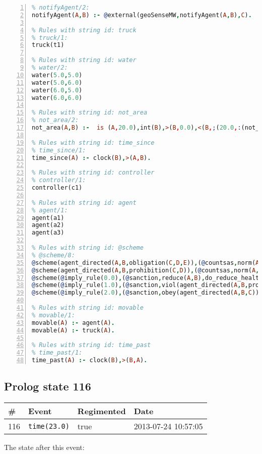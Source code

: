 \documentclass[11pt]{article}\usepackage[utf8]{inputenc}\usepackage{geometry}
\begin{document}
\begin{lstlisting}[language=Prolog, numbers=left]
% Rules with string id: notifyAgent
% notifyAgent/2:
notifyAgent(A,B) :- @external(geoSenseMW,notifyAgent(A,B),C).

% Rules with string id: truck
% truck/1:
truck(t1)

% Rules with string id: water
% water/2:
water(5.0,5.0)
water(5.0,6.0)
water(6.0,5.0)
water(6.0,6.0)

% Rules with string id: not_area
% not_area/2:
not_area(A,B) :-  is (A,20.0),int(B),>(B,0.0),<(B,;(20.0,:(not_area(A,B), is (-(B),20.0)))),int(A),>(A,0.0),<(A,;(20.0,:(area(A,B),-(int(A))))),int(B),>(A,0.0),>(B,0.0),<(A,21.0),<(B,21.0).

% Rules with string id: time_since
% time_since/1:
time_since(A) :- clock(B),>(A,B).

% Rules with string id: controller
% controller/1:
controller(c1)

% Rules with string id: agent
% agent/1:
agent(a1)
agent(a2)
agent(a3)

% Rules with string id: @scheme
% @scheme/8:
@scheme(agent_directed(A,B,obligation(C,D,E)),(@countsas,norm(A,B,F,obligation(C,D,E)),F),false,(listTrue(C)),(time_past(D)),false,[plus(viol(agent_directed(A,B,obligation(C,D,E))))|[]],[plus(obey(agent_directed(A,B,obligation(C,D,E))))|[]])
@scheme(agent_directed(A,B,prohibition(C,D)),(@countsas,norm(A,B,E,prohibition(C,D)),E),(listTrue(C)),false,(false),false,[plus(viol(agent_directed(A,B,prohibition(C,D))))|[]],[plus(obey(agent_directed(A,B,prohibition(C,D))))|[]])
@scheme(@imply_rule(0.0),(@sanction,reduce(A,B),do_reduce_health(A,B),notifyAgent(A,changed(status))),true,false,false,false,[min(reduce(A,B))|[]],[])
@scheme(@imply_rule(1.0),(@sanction,viol(agent_directed(A,B,prohibition(C,D))),do_sanction(D)),true,false,false,false,[min(viol(agent_directed(A,B,prohibition(C,D))))|[]],[])
@scheme(@imply_rule(2.0),(@sanction,obey(agent_directed(A,B,C))),true,false,false,false,[min(obey(agent_directed(A,B,C)))|[]],[])

% Rules with string id: movable
% movable/1:
movable(A) :- agent(A).
movable(A) :- truck(A).

% Rules with string id: time_past
% time_past/1:
time_past(A) :- clock(B),>(B,A).

\end{lstlisting}
\clearpage 
\subsection{Prolog state 116}
\begin{table}[ht]
\centering 
\begin{tabular}{l l l l} 
\textbf{\#} & \textbf{Event} & \textbf{Regimented} & \textbf{Date} \\ [0.5ex] 
\hline
116&\texttt{time(23.0)}&true&2013-07-24 10:57:05\\ [1ex] \hline\end{tabular}
\end{table}
The state after this event:
\end{document}
